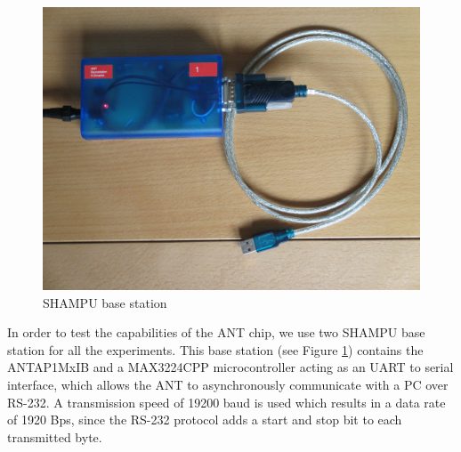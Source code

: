 \begin{figure}[H]
	\centering
	\includegraphics[scale=.5]{content/images/SHAMPUbase.JPG}
	\caption{SHAMPU base station}\label{fig:shampubase}
\end{figure}
In order to test the capabilities of the ANT chip, we use two SHAMPU base station for all the experiments. This base station (see Figure \ref{fig:shampubase}) contains the ANTAP1MxIB and a MAX3224CPP microcontroller acting as an UART to serial interface, which allows the ANT to asynchronously communicate with a PC over RS-232. A transmission speed of 19200 baud is used which results in a data rate of 1920 Bps, since the RS-232 protocol adds a start and stop bit to each transmitted byte.
